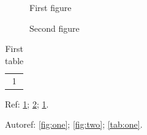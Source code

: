 \documentclass{article}
\begin{document}
\begin{figure}[h]
  \capstart
  \centering
  \caption{First figure}\label{fig:one}
\end{figure}
\begin{figure}[h]
  \centering
  \caption{Second figure}\label{fig:two}
\end{figure}
\begin{table}[h]
  \capstart
  \centering
  \caption{First table}\label{tab:one}
  \begin{tabular}{c}1\end{tabular}
\end{table}

Ref: \ref{fig:one}; \ref{fig:two}; \ref{tab:one}.

Autoref: \autoref{fig:one}; \autoref{fig:two}; \autoref{tab:one}.
\end{document}

